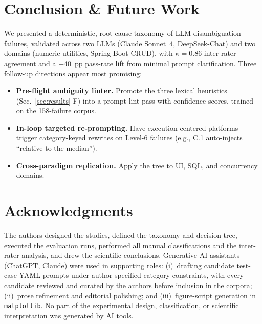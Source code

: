 \documentclass[conference]{IEEEtran}
\begin{document}
\section{Conclusion \& Future Work}\label{sec:conclusion}
We presented a deterministic, root-cause taxonomy of LLM disambiguation failures, validated across two LLMs (Claude Sonnet~4, DeepSeek-Chat) and two domains (numeric utilities, Spring Boot CRUD), with $\kappa{=}0.86$ inter-rater agreement and a +40~pp pass-rate lift from minimal prompt clarification. Three follow-up directions appear most promising:

\begin{itemize}\itemsep1pt
  \item \textbf{Pre-flight ambiguity linter.} Promote the three lexical heuristics (Sec.~\ref{sec:results}-F) into a prompt-lint pass with confidence scores, trained on the 158-failure corpus.
  \item \textbf{In-loop targeted re-prompting.} Have execution-centered platforms~\cite{anonymizedphd} trigger category-keyed rewrites on Level-6 failures (e.g., C.1 auto-injects ``relative to the median'').
  \item \textbf{Cross-paradigm replication.} Apply the tree to UI, SQL, and concurrency domains.
\end{itemize}

\section*{Acknowledgments}
The authors designed the studies, defined the taxonomy and decision tree, executed the evaluation runs, performed all manual classifications and the inter-rater analysis, and drew the scientific conclusions. Generative AI assistants (ChatGPT, Claude) were used in supporting roles: (i)~drafting candidate test-case YAML prompts under author-specified category constraints, with every candidate reviewed and curated by the authors before inclusion in the corpora; (ii)~prose refinement and editorial polishing; and (iii)~figure-script generation in \texttt{matplotlib}. No part of the experimental design, classification, or scientific interpretation was generated by AI tools.
\end{document}
